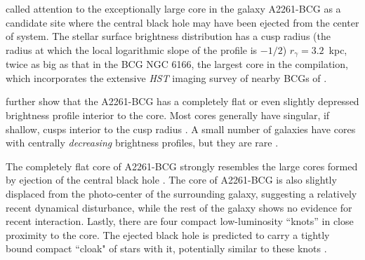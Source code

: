 \documentclass[useAMS,usenatbib]{emulateapj}
\newcommand{\src}{BCG\,2261}
\newcommand{\msun}{M_{\odot}}
\newcommand{\rcusp}{$r_\gamma$}
\begin{document}
\citet{postman12} called attention to the exceptionally large core
in the galaxy A2261-BCG as a candidate site where the central black
hole may have been ejected from the center of system.
The stellar surface brightness distribution has a cusp radius (the
radius at which the local logarithmic slope of the profile is $-1/2$)
$r_\gamma=3.2$~kpc, twice as big as that in the BCG NGC 6166,
the largest core in the \citet{lauer07} compilation,
which incorporates the extensive {\it HST} imaging survey of 
nearby BCGs of \citet{laine03}.

\citet{postman12} further show that the A2261-BCG has a completely flat or
even slightly depressed brightness profile interior to the core.
Most cores generally have singular, if shallow, cusps interior to
the cusp radius \citep{l95,l05}.  A small number of galaxies
have cores with centrally {\it decreasing} brightness profiles,
but they are rare \citep{l02,l05}.

The completely flat core of A2261-BCG strongly resembles
the large cores formed by ejection of the central black hole \citep{gm}.
The core of A2261-BCG is also slightly displaced from the photo-center of the
surrounding galaxy, suggesting a relatively recent dynamical 
disturbance, while the rest of the galaxy shows no evidence for recent
interaction.  Lastly, there are four compact low-luminosity
``knots'' in close proximity to the core.  The ejected black hole
is predicted to carry a tightly bound compact ``cloak" of stars
with it, potentially similar to these knots \citet{m09}.




\end{document}
